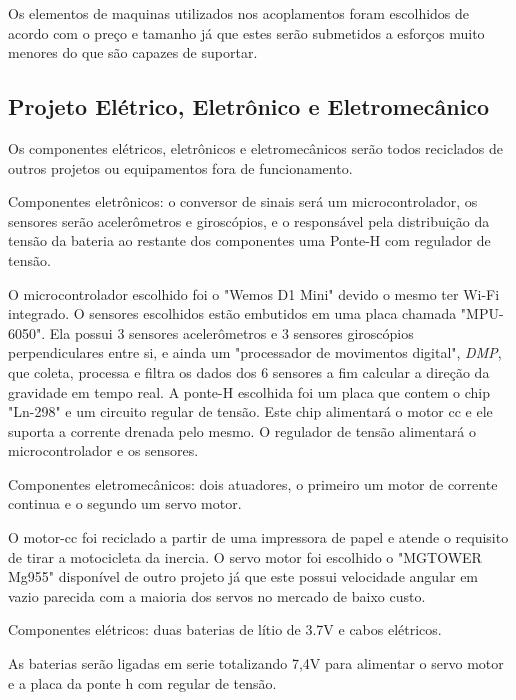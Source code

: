 \documentclass[conference,harvard,brazil,english]{sbatex}
\begin{document}
            Os elementos de maquinas utilizados nos acoplamentos foram escolhidos de acordo com o preço e tamanho já que estes serão submetidos a esforços muito menores do que são capazes de suportar.
            
        \subsection{Projeto Elétrico, Eletrônico e Eletromecânico}
        
            Os componentes elétricos, eletrônicos e eletromecânicos serão todos reciclados de outros projetos ou equipamentos fora de funcionamento.
            
            Componentes eletrônicos: o conversor de sinais será um microcontrolador, os sensores serão acelerômetros e giroscópios, e o responsável pela distribuição da tensão da bateria ao restante dos componentes uma Ponte-H com regulador de tensão. 
            
            O microcontrolador escolhido foi o "Wemos D1 Mini" devido o mesmo ter Wi-Fi integrado.
            O sensores escolhidos estão embutidos em uma placa chamada "MPU-6050". Ela possui 3 sensores acelerômetros e 3 sensores giroscópios perpendiculares entre si, e ainda um "processador de movimentos digital", \textit{DMP}, que coleta, processa e filtra os dados dos 6 sensores a fim calcular a direção da gravidade em tempo real.
            A ponte-H escolhida foi um placa que contem o chip "Ln-298" e um circuito regular de tensão. Este chip alimentará o motor cc e ele suporta a corrente drenada pelo mesmo. O regulador de tensão alimentará o microcontrolador e os sensores.
            
            Componentes eletromecânicos: dois atuadores, o primeiro um motor de corrente continua e o segundo um servo motor. 
            
            O motor-cc foi reciclado a partir de uma impressora de papel e atende o requisito de tirar a motocicleta da inercia. 
            O servo motor foi escolhido o "MGTOWER Mg955" disponível de outro projeto já que este possui velocidade angular em vazio parecida com a maioria dos servos no mercado de baixo custo.
            
            Componentes elétricos: duas baterias de lítio de 3.7V e cabos elétricos.
            
            As baterias serão ligadas em serie totalizando 7,4V para alimentar o servo motor e a placa da ponte h com regular de tensão.
        
\end{document}
